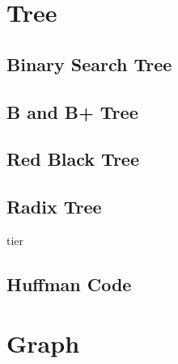 \section{Tree}

\subsection{Binary Search Tree}

\subsection{B and B+ Tree}

\subsection{Red Black Tree}

\subsection{Radix Tree}

tier

\subsection{Huffman Code}

\section{Graph}
